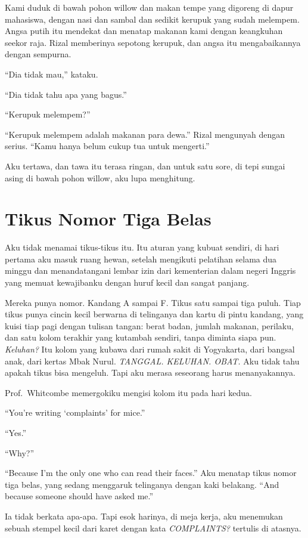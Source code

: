 \documentclass[11pt,twoside,openany]{book}
\begin{document}
Kami duduk di bawah pohon willow dan makan tempe yang digoreng di dapur mahasiswa, dengan nasi dan sambal dan sedikit kerupuk yang sudah melempem. Angsa putih itu mendekat dan menatap makanan kami dengan keangkuhan seekor raja. Rizal memberinya sepotong kerupuk, dan angsa itu mengabaikannya dengan sempurna.

``Dia tidak mau,'' kataku.

``Dia tidak tahu apa yang bagus.''

``Kerupuk melempem?''

``Kerupuk melempem adalah makanan para dewa.'' Rizal mengunyah dengan serius. ``Kamu hanya belum cukup tua untuk mengerti.''

Aku tertawa, dan tawa itu terasa ringan, dan untuk satu sore, di tepi sungai asing di bawah pohon willow, aku lupa menghitung.

\chapter{Tikus Nomor Tiga Belas}
Aku tidak menamai tikus-tikus itu. Itu aturan yang kubuat sendiri, di hari pertama aku masuk ruang hewan, setelah mengikuti pelatihan selama dua minggu dan menandatangani lembar izin dari kementerian dalam negeri Inggris yang memuat kewajibanku dengan huruf kecil dan sangat panjang.

Mereka punya nomor. Kandang A sampai F. Tikus satu sampai tiga puluh. Tiap tikus punya cincin kecil berwarna di telinganya dan kartu di pintu kandang, yang kuisi tiap pagi dengan tulisan tangan: berat badan, jumlah makanan, perilaku, dan satu kolom terakhir yang kutambah sendiri, tanpa diminta siapa pun. \emph{Keluhan?} Itu kolom yang kubawa dari rumah sakit di Yogyakarta, dari bangsal anak, dari kertas Mbak Nurul. \emph{TANGGAL. KELUHAN. OBAT.} Aku tidak tahu apakah tikus bisa mengeluh. Tapi aku merasa seseorang harus menanyakannya.

Prof.~Whitcombe memergokiku mengisi kolom itu pada hari kedua.

``You're writing `complaints' for mice.''

``Yes.''

``Why?''

``Because I'm the only one who can read their faces.'' Aku menatap tikus nomor tiga belas, yang sedang menggaruk telinganya dengan kaki belakang. ``And because someone should have asked me.''

Ia tidak berkata apa-apa. Tapi esok harinya, di meja kerja, aku menemukan sebuah stempel kecil dari karet dengan kata \emph{COMPLAINTS?} tertulis di atasnya.
\end{document}
